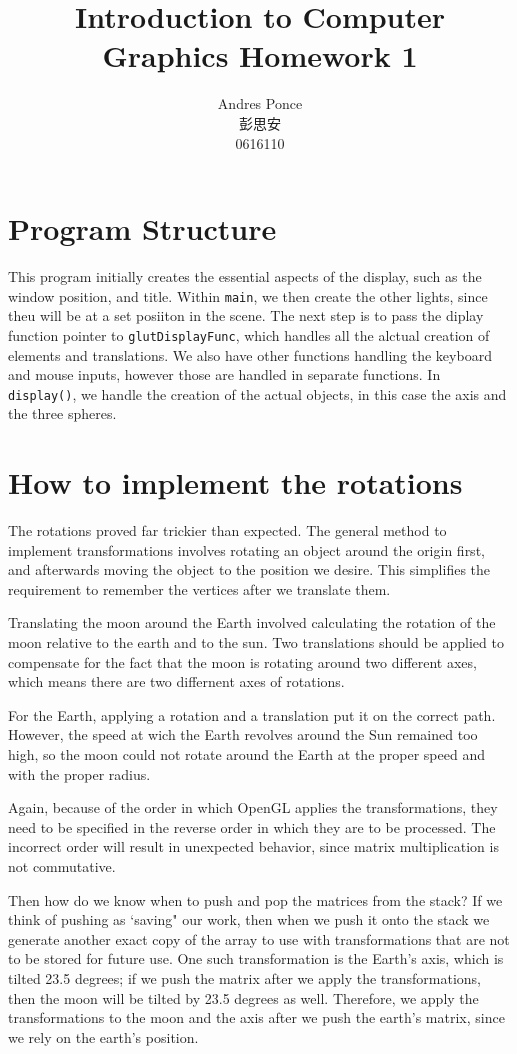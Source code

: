 \documentclass{article}
\title{Introduction to Computer Graphics Homework 1}
\author{Andres Ponce  \\
	\cjkfont 彭思安\\
	0616110}
\begin{document}
\maketitle
\section{Program Structure}

This program initially creates the essential aspects of the display, such as the window position, and title. Within 
\texttt{main}, we then create the other lights, since theu will be at a set posiiton in the scene. The next step is to 
pass the diplay function pointer to \texttt{glutDisplayFunc}, which handles all the alctual creation of elements and
translations. We also have other functions handling the keyboard and mouse inputs, however those are handled in separate
functions. In \texttt{display()}, we handle the creation of the actual objects, in this case the axis and the three 
spheres. 

\section{How to implement the rotations}
The rotations proved far trickier than expected. The general method to implement transformations involves rotating an
object around the origin first, and afterwards moving the object to the position we desire. This simplifies the 
requirement to remember the vertices after we translate them.

Translating the moon around the Earth involved calculating the rotation of the moon relative to the earth and 
to the sun. Two translations should be applied to compensate for the fact that the moon is rotating around 
two different axes, which means there are two differnent axes of rotations. 

For the Earth, applying a  rotation and a translation put it on the correct path. However, the speed at wich the 
Earth revolves around the Sun remained too high, so the moon could not rotate around the Earth at the proper speed
and with the proper radius.

Again, because of the order in which OpenGL applies the transformations, they need to be specified in the reverse
order in which they are to be processed. The incorrect order will result in unexpected behavior, since matrix 
multiplication is not commutative.

Then how do we know when to push and pop the matrices from the stack? If we think of pushing as `saving" our 
work, then when we push it onto the stack we generate another exact copy of the array to use with transformations
that are not to be stored for future use. One such transformation is the Earth's axis, which is tilted 23.5
degrees; if we push the matrix after we apply the transformations, then the moon will be tilted by 23.5 degrees
as well. Therefore, we apply the transformations to the moon and the axis after we push the earth's matrix, 
since we rely on the earth's position.
\end{document}
